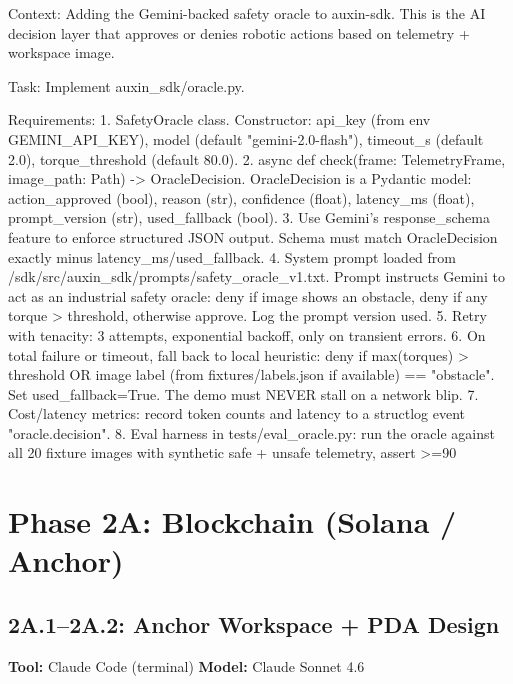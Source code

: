 \documentclass[11pt, a4paper]{article}
\begin{document}
\begin{promptbox}
Context: Adding the Gemini-backed safety oracle to auxin-sdk. This is the AI decision layer that approves or denies robotic actions based on telemetry + workspace image.

Task: Implement auxin_sdk/oracle.py.

Requirements:
1. SafetyOracle class. Constructor: api_key (from env GEMINI_API_KEY), model (default "gemini-2.0-flash"), timeout_s (default 2.0), torque_threshold (default 80.0).
2. async def check(frame: TelemetryFrame, image_path: Path) -> OracleDecision. OracleDecision is a Pydantic model: action_approved (bool), reason (str), confidence (float), latency_ms (float), prompt_version (str), used_fallback (bool).
3. Use Gemini's response_schema feature to enforce structured JSON output. Schema must match OracleDecision exactly minus latency_ms/used_fallback.
4. System prompt loaded from /sdk/src/auxin_sdk/prompts/safety_oracle_v1.txt. Prompt instructs Gemini to act as an industrial safety oracle: deny if image shows an obstacle, deny if any torque > threshold, otherwise approve. Log the prompt version used.
5. Retry with tenacity: 3 attempts, exponential backoff, only on transient errors.
6. On total failure or timeout, fall back to local heuristic: deny if max(torques) > threshold OR image label (from fixtures/labels.json if available) == "obstacle". Set used_fallback=True. The demo must NEVER stall on a network blip.
7. Cost/latency metrics: record token counts and latency to a structlog event "oracle.decision".
8. Eval harness in tests/eval_oracle.py: run the oracle against all 20 fixture images with synthetic safe + unsafe telemetry, assert >=90%
\end{promptbox}

\section{Phase 2A: Blockchain (Solana / Anchor)}

\subsection*{2A.1--2A.2: Anchor Workspace + PDA Design}
\textbf{Tool:} Claude Code (terminal) \quad \textbf{Model:} Claude Sonnet 4.6
\end{document}
